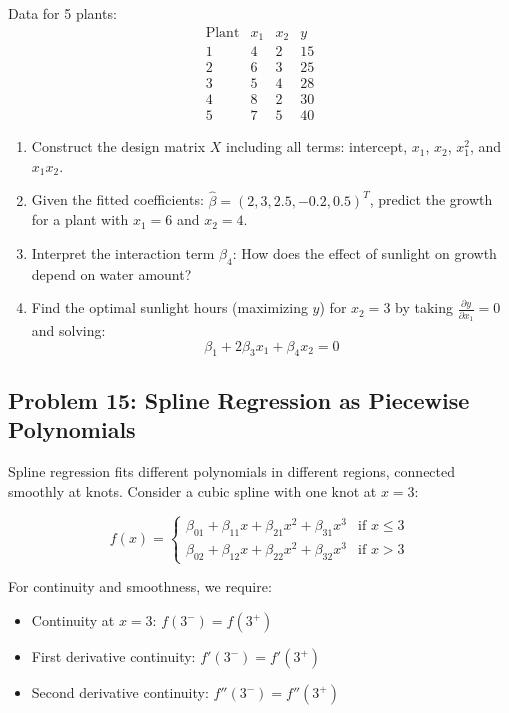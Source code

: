 \documentclass[12pt]{article}
\begin{document}
Data for 5 plants:
\[
\begin{array}{c|c|c|c}
\text{Plant} & x_1 & x_2 & y \\
\hline
1 & 4 & 2 & 15 \\
2 & 6 & 3 & 25 \\
3 & 5 & 4 & 28 \\
4 & 8 & 2 & 30 \\
5 & 7 & 5 & 40
\end{array}
\]

\begin{enumerate}[label=(\alph*)]
\item Construct the design matrix \(X\) including all terms: intercept, \(x_1\), \(x_2\), \(x_1^2\), and \(x_1 x_2\).

\item Given the fitted coefficients: \(\hat{\beta} = (2, 3, 2.5, -0.2, 0.5)^T\), predict the growth for a plant with \(x_1 = 6\) and \(x_2 = 4\).

\item Interpret the interaction term \(\beta_4\): How does the effect of sunlight on growth depend on water amount?

\item Find the optimal sunlight hours (maximizing \(y\)) for \(x_2 = 3\) by taking \(\frac{\partial y}{\partial x_1} = 0\) and solving:
\[
\beta_1 + 2\beta_3 x_1 + \beta_4 x_2 = 0
\]
\end{enumerate}

\subsection*{Problem 15: Spline Regression as Piecewise Polynomials}

Spline regression fits different polynomials in different regions, connected smoothly at knots. Consider a cubic spline with one knot at \(x = 3\):

\[
f(x) = \begin{cases}
\beta_{01} + \beta_{11}x + \beta_{21}x^2 + \beta_{31}x^3 & \text{if } x \leq 3 \\
\beta_{02} + \beta_{12}x + \beta_{22}x^2 + \beta_{32}x^3 & \text{if } x > 3
\end{cases}
\]

For continuity and smoothness, we require:
\begin{itemize}
\item Continuity at \(x = 3\): \(f(3^-) = f(3^+)\)
\item First derivative continuity: \(f'(3^-) = f'(3^+)\)
\item Second derivative continuity: \(f''(3^-) = f''(3^+)\)
\end{itemize}
\end{document}
